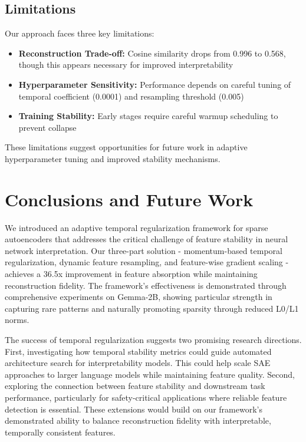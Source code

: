 \documentclass{article} %
\begin{document}
\subsection{Limitations}
Our approach faces three key limitations:

\begin{itemize}
    \item \textbf{Reconstruction Trade-off:} Cosine similarity drops from 0.996 to 0.568, though this appears necessary for improved interpretability
    \item \textbf{Hyperparameter Sensitivity:} Performance depends on careful tuning of temporal coefficient (0.0001) and resampling threshold (0.005)
    \item \textbf{Training Stability:} Early stages require careful warmup scheduling to prevent collapse
\end{itemize}

These limitations suggest opportunities for future work in adaptive hyperparameter tuning and improved stability mechanisms.

\section{Conclusions and Future Work}
\label{sec:conclusion}

We introduced an adaptive temporal regularization framework for sparse autoencoders that addresses the critical challenge of feature stability in neural network interpretation. Our three-part solution - momentum-based temporal regularization, dynamic feature resampling, and feature-wise gradient scaling - achieves a 36.5x improvement in feature absorption while maintaining reconstruction fidelity. The framework's effectiveness is demonstrated through comprehensive experiments on Gemma-2B, showing particular strength in capturing rare patterns and naturally promoting sparsity through reduced L0/L1 norms.

The success of temporal regularization suggests two promising research directions. First, investigating how temporal stability metrics could guide automated architecture search for interpretability models. This could help scale SAE approaches to larger language models while maintaining feature quality. Second, exploring the connection between feature stability and downstream task performance, particularly for safety-critical applications where reliable feature detection is essential. These extensions would build on our framework's demonstrated ability to balance reconstruction fidelity with interpretable, temporally consistent features.



\end{document}
